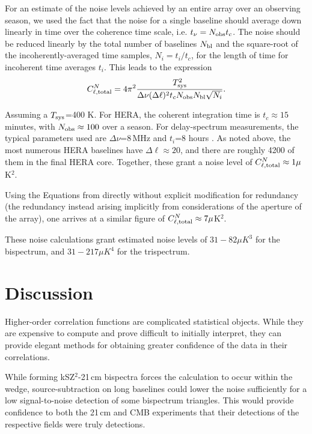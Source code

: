 For an estimate of the noise levels achieved by an entire array over an observing season, we used the fact that the noise for a single baseline should average down linearly in time over the coherence time scale, i.e. $t_{\nu} = N_{\rm obs}t_c$. The noise should be reduced linearly by the total number of baselines $N_{\rm bl}$ and the square-root of the incoherently-averaged time samples, $N_i = t_i/t_c$, for the length of time for incoherent time averages $t_i$. This leads to the expression
\begin{equation}
C^N_{\ell,{\rm total}} = 4\pi^2\frac{T_{\rm sys}^2}{\Delta\nu(\Delta\ell)^2 t_c N_{\rm obs} N_{\rm bl}\sqrt{N_i}}.
\label{eq:ksz_21cm_HERA_noise_total}
\end{equation}

Assuming a $T_{\rm sys}$=400 K. For HERA, the coherent integration time is $t_c\approx 15$\,minutes, with $N_{\rm obs}\approx100$ over a season. For delay-spectrum measurements, the typical parameters used are $\Delta\nu$=8\,MHz and $t_i$=8 hours \citep{Ali.15}. As noted above, the most numerous HERA baselines have $\Delta\ell\approx 20$, and there are roughly 4200 of them in the final HERA core. Together, these grant a noise level of $C^N_{\ell,{\rm total}}\approx 1 \mu$K$^2$.

Using the Equations from \cite{Zaldarriaga.04} directly without explicit modification for redundancy (the redundancy instead arising implicitly from considerations of the aperture of the array), one arrives at a similar figure of $C^N_{\ell,{\rm total}}\approx 7 \mu$K$^2$. 

These noise calculations grant estimated noise levels of $31 - 82 \mu K^3$ for the bispectrum, and $31 - 217 \mu K^4$ for the trispectrum.

\section{Discussion}
\label{sec:ksz_21cm_disc}
Higher-order correlation functions are complicated statistical objects. While they are expensive to compute and prove difficult to initially interpret, they can provide elegant methods for obtaining greater confidence of the data in their correlations. 

While forming kSZ$^2$-21\,cm bispectra forces the calculation to occur within the wedge, source-subtraction on long baselines could lower the noise sufficiently for a low signal-to-noise detection of some bispectrum triangles. This would provide confidence to both the 21\,cm and CMB experiments that their detections of the respective fields were truly detections.

